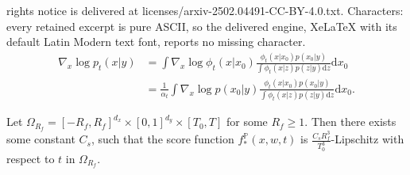 \documentclass[10pt,a4paper]{amsart}
\newcommand{\dif}{\mathrm{d}}
\renewcommand{\P}{\mathbb{P}}
\begin{document}
rights notice is delivered at licenses/arxiv-2502.04491-CC-BY-4.0.txt. Characters: every retained excerpt is pure ASCII, so the delivered engine, XeLaTeX with its default Latin Modern text font, reports no missing character.
    \begin{align}
        \nabla_x\log p_t(x|y)
        &=\int \nabla_x\log\phi_t(x|x_0)\frac{\phi_t(x|x_0)p(x_0|y)}{\int \phi_t(x|z)p(z|y)\dif z}\dif x_0 \label{eq:score_1}\\
        &=\frac{1}{\alpha_t}\int \nabla_x\log p(x_0|y)\frac{\phi_t(x|x_0)p(x_0|y)}{\int \phi_t(x|z)p(z|y)\dif z}\dif x_0. \label{eq:score_2}
    \end{align}

\begin{lemma}\label{lem:lip_t}
    Let $\Omega_{R_f}=[-R_f,R_f]^{d_x}\times[0,1]^{d_y}\times[T_0,T]$ for some $R_f\geq 1$. Then there exists some constant $C_s$, such that the score function $f_*^\P(x,w,t)$ is $\frac{C_sR_f^3}{T_0^3}$-Lipschitz with respect to $t$ in $\Omega_{R_f}$.
\end{lemma}
\end{document}
